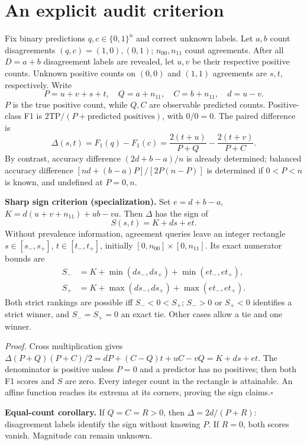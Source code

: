 \documentclass[a4paper]{esannV2}
\newcommand{\F}{F_1}
\begin{document}
\section{An explicit audit criterion}
Fix binary predictions $q,c\in\{0,1\}^n$ and correct unknown labels.
Let $a,b$ count disagreements $(q,c)=(1,0),(0,1)$;
$n_{00},n_{11}$ count agreements. After all $D=a+b$ disagreement labels are
revealed, let $u,v$ be their respective positive counts. Unknown positive
counts on $(0,0)$ and $(1,1)$ agreements are $s,t$, respectively. Write
\[
 P=u+v+s+t,\quad Q=a+n_{11},\quad C=b+n_{11},\quad d=u-v.
\]
$P$ is the true positive count, while $Q,C$ are observable predicted counts.
Positive-class F1 is $2\mathrm{TP}/(P+\text{predicted positives})$, with
$0/0=0$. The paired difference is
\begin{equation}\label{eq:gap}
 \Delta(s,t)=\F(q)-\F(c)=\frac{2(t+u)}{P+Q}-\frac{2(t+v)}{P+C}.
\end{equation}
By contrast, accuracy difference $(2d+b-a)/n$ is already determined;
balanced accuracy difference $[nd+(b-a)P]/[2P(n-P)]$ is determined if
$0<P<n$ is known, and undefined at $P=0,n$.

\noindent\textbf{Sharp sign criterion (specialization).}
Set $e=d+b-a$, $K=d(u+v+n_{11})+ub-va$. Then $\Delta$ has the sign of
\begin{equation}\label{eq:affine}
 S(s,t)=K+ds+et.
\end{equation}
Without prevalence information, agreement queries leave an integer rectangle
$s\in[s_-,s_+]$, $t\in[t_-,t_+]$, initially $[0,n_{00}]\times[0,n_{11}]$.
Its exact numerator bounds are
\begin{align}\label{eq:bounds}
 S_-&=K+\min(ds_-,ds_+)+\min(et_-,et_+),\nonumber\\
 S_+&=K+\max(ds_-,ds_+)+\max(et_-,et_+).
\end{align}
Both strict rankings are possible iff $S_-<0<S_+$; $S_->0$ or $S_+<0$
identifies a strict winner, and $S_-=S_+=0$ an exact tie. Other cases allow a tie
and one winner.

\noindent\textit{Proof.} Cross multiplication gives
$\Delta(P+Q)(P+C)/2=dP+(C-Q)t+uC-vQ=K+ds+et$.
The denominator is positive unless $P=0$ and a predictor has no positives;
then both F1 scores and $S$ are zero. Every integer count in the rectangle
is attainable. An affine function reaches its extrema at its corners,
proving the sign claims.\hfill$\square$

\smallskip\noindent\textbf{Equal-count corollary.}
If $Q=C=R>0$, then $\Delta=2d/(P+R)$: disagreement labels identify the sign
without knowing $P$. If $R=0$, both scores vanish. Magnitude can remain unknown.
\end{document}
